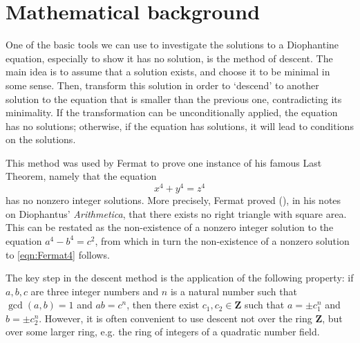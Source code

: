 \documentclass[sigplan,10pt,nonacm,
screen]{acmart} \settopmatter{printfolios=true,printccs=false,printacmref=false}
\newcommand{\ZZ}{\mathbf{Z}}
\begin{document}
\section{Mathematical background}\label{sec:Background}

One of the basic tools we can use to investigate the solutions to a Diophantine equation, especially to show it has no solution, is the method of descent.
The main idea is to assume that a solution exists, and choose it to be minimal in some sense.
Then, transform this solution in order to `descend' to another solution to the equation that is smaller than the previous one, contradicting its minimality.
If the transformation can be unconditionally applied, the equation has no solutions;
otherwise, if the equation has solutions, it will lead to conditions on the solutions.

This method was used by Fermat to prove one instance of his famous Last Theorem, namely that the equation
\begin{equation}\label{eqn:Fermat4}
 x^4+y^4=z^4
 \end{equation}
 has no nonzero integer solutions. More precisely, Fermat proved (\cite[Section 1.6]{edwards-fermat}), in his notes on Diophantus' \emph{Arithmetica}, that there exists no right triangle with square area.
 This can be restated as the non-existence of a nonzero integer solution to the equation $ a^4-b^4=c^2 $, from which in turn the non-existence of a nonzero solution to \eqref{eqn:Fermat4} follows.

The key step in the descent method is the application of the following property: if $a,b,c$ are three integer numbers and $n$ is a natural number such that $\gcd(a,b)=1$ and $ab=c^n$, then there exist $c_1,c_2 \in \ZZ$ such that $a=\pm c_1^n$ and $b=\pm c_2^n$. However, it is often convenient to use descent not over the ring $\ZZ$, but over some larger ring, e.g. the ring of integers of a quadratic number field.
\end{document}
